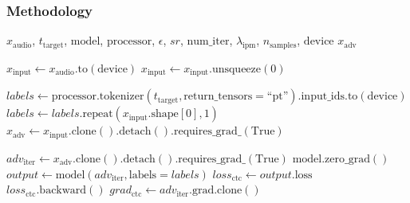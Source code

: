\documentclass[a4paper,12pt]{article}
\begin{document}
\subsubsection{Methodology}

\begin{algorithm}[H]
\caption{Cramér-IPM Adversarial Attack}
\begin{algorithmic}[1]
\Require $x_{\text{audio}}$, $t_{\text{target}}$, $\text{model}$, $\text{processor}$, $\epsilon$, $sr$, $\text{num\_iter}$, $\lambda_{\text{ipm}}$, $n_{\text{samples}}$, $\text{device}$ 
\Ensure $x_{\text{adv}}$ 

\State $x_{\text{input}} \gets x_{\text{audio}}.\text{to}(\text{device})$ 
    \State $x_{\text{input}} \gets x_{\text{input}}.\text{unsqueeze}(0)$ 
\EndIf

\State $labels \gets \text{processor}.\text{tokenizer}(t_{\text{target}}, \text{return\_tensors}=\text{``pt''}).\text{input\_ids}.\text{to}(\text{device})$ 
\State $labels \gets labels.\text{repeat}(x_{\text{input}}.\text{shape}[0], 1)$ 
\State $x_{\text{adv}} \gets x_{\text{input}}.\text{clone}().\text{detach}().\text{requires\_grad\_}(\text{True})$ 

 
    \State $adv_{\text{iter}} \gets x_{\text{adv}}.\text{clone}().\text{detach}().\text{requires\_grad\_}(\text{True})$ 
    \State $\text{model}.\text{zero\_grad}()$ 
    \State $output \gets \text{model}(adv_{\text{iter}}, \text{labels}=labels)$ 
    \State $loss_{\text{ctc}} \gets output.\text{loss}$ 
    \State $loss_{\text{ctc}}.\text{backward}()$ 
    \State $grad_{\text{ctc}} \gets adv_{\text{iter}}.\text{grad}.\text{clone}()$ 
    

\end{algorithmic}
\end{algorithm}
\end{document}
